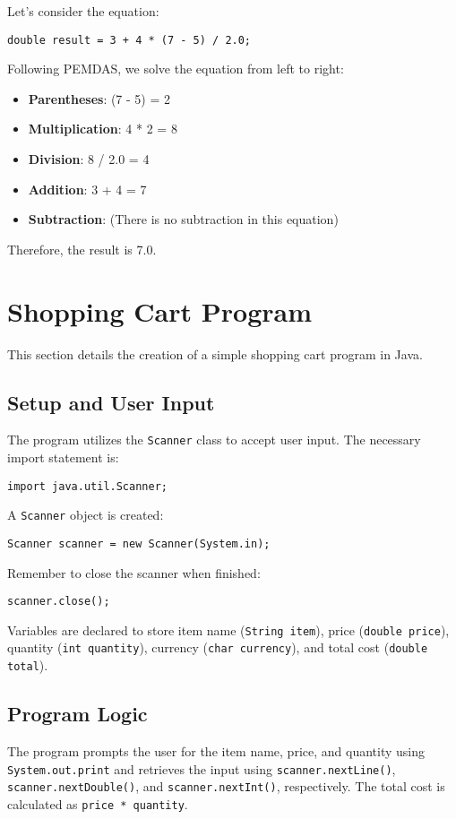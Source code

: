 \documentclass{article}
\begin{document}
Let's consider the equation:

\texttt{double result = 3 + 4 * (7 - 5) / 2.0;}

Following PEMDAS, we solve the equation from left to right:

\begin{itemize}
    \item \textbf{Parentheses}: (7 - 5) = 2
    \item \textbf{Multiplication}: 4 * 2 = 8
    \item \textbf{Division}: 8 / 2.0 = 4
    \item \textbf{Addition}: 3 + 4 = 7
    \item \textbf{Subtraction}: (There is no subtraction in this equation)
\end{itemize}

Therefore, the result is 7.0.


\section{Shopping Cart Program}

This section details the creation of a simple shopping cart program in Java.

\subsection{Setup and User Input}

The program utilizes the \texttt{Scanner} class to accept user input.  The necessary import statement is:

\texttt{import java.util.Scanner;}

A \texttt{Scanner} object is created:

\texttt{Scanner scanner = new Scanner(System.in);}

Remember to close the scanner when finished:

\texttt{scanner.close();}

Variables are declared to store item name (\texttt{String item}), price (\texttt{double price}), quantity (\texttt{int quantity}), currency (\texttt{char currency}), and total cost (\texttt{double total}).


\subsection{Program Logic}

The program prompts the user for the item name, price, and quantity using \texttt{System.out.print} and retrieves the input using \texttt{scanner.nextLine()}, \texttt{scanner.nextDouble()}, and \texttt{scanner.nextInt()}, respectively.  The total cost is calculated as \texttt{price * quantity}.
\end{document}
